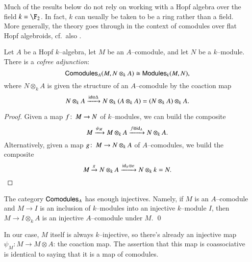 \begin{remark}
Much of the results below do not rely on working with a Hopf algebra over the field $k = \F_2$.  In fact, $k$ can usually be taken to be a ring rather than a field. More generally, the theory goes through in the context of comodules over flat Hopf algebroids, cf.\ also .
\end{remark}

\begin{lemma}
Let $A$ be a Hopf $k$--algebra, let $M$ be an $A$--comodule, and let $N$ be a $k$--module.  There is a \textit{cofree adjunction}: \[\mathsf{Comodules}_A(M, N \otimes_k A) \cong \mathsf{Modules}_k(M, N),\] where $N \otimes_k A$ is given the structure of an $A$--comodule by the coaction map \[N \otimes_k A \xrightarrow{\mathrm{id} \otimes \Delta} N \otimes_k (A \otimes_k A) = (N \otimes_k A) \otimes_k A.\]
\end{lemma}
\begin{proof}
Given a map $f\colon\thinspace M \to N$ of $k$--modules, we can build the composite \[M \xrightarrow{\psi_M} M \otimes_k A \xrightarrow{f \otimes \mathrm{id}_A} N \otimes_k A.\]  Alternatively, given a map $g\colon\thinspace M \to N \otimes_k A$ of $A$--comodules, we build the composite \[M \xrightarrow{g} N \otimes_k A \xrightarrow{\mathrm{id}_N \otimes \varepsilon} N \otimes_k k = N. \qedhere\]
\end{proof}

\begin{corollary}
The category $\mathsf{Comodules}_A$ has enough injectives.  Namely, if $M$ is an $A$--comodule and $M \to I$ is an inclusion of $k$--modules into an injective $k$--module $I$, then $M \to I \otimes_k A$ is an injective $A$--comodule under $M$. \qed
\end{corollary}
\begin{remark}
In our case, $M$ itself is always $k$--injective, so there's already an injective map $\psi_M: M \to M \otimes A$: the coaction map.  The assertion that this map is coassociative is identical to saying that it is a map of comodules.
\end{remark}

